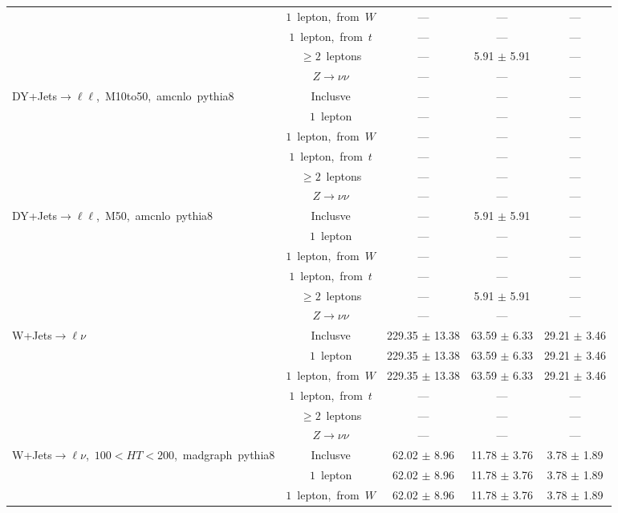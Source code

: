\documentclass{article}
\begin{document}
\begin{longtable}{|l|c|c|c|c|}
 & $1$~lepton,~from~$W$  & ---  & ---  & --- \\* 
 & $1$~lepton,~from~$t$  & ---  & ---  & --- \\* 
 & $\ge2$~leptons  & ---  & 5.91 $\pm$ 5.91  & --- \\* 
 & $Z\rightarrow\nu\nu$  & ---  & ---  & --- \\* 
\hline 
\multirow{6}{*}{DY+Jets$\rightarrow\ell\ell$,~M10to50,~amcnlo~pythia8} & Inclusve  & ---  & ---  & --- \\* 
 & $1$~lepton  & ---  & ---  & --- \\* 
 & $1$~lepton,~from~$W$  & ---  & ---  & --- \\* 
 & $1$~lepton,~from~$t$  & ---  & ---  & --- \\* 
 & $\ge2$~leptons  & ---  & ---  & --- \\* 
 & $Z\rightarrow\nu\nu$  & ---  & ---  & --- \\* 
\hline 
\multirow{6}{*}{DY+Jets$\rightarrow\ell\ell$,~M50,~amcnlo~pythia8} & Inclusve  & ---  & 5.91 $\pm$ 5.91  & --- \\* 
 & $1$~lepton  & ---  & ---  & --- \\* 
 & $1$~lepton,~from~$W$  & ---  & ---  & --- \\* 
 & $1$~lepton,~from~$t$  & ---  & ---  & --- \\* 
 & $\ge2$~leptons  & ---  & 5.91 $\pm$ 5.91  & --- \\* 
 & $Z\rightarrow\nu\nu$  & ---  & ---  & --- \\* 
\hline 
\multirow{6}{*}{W+Jets$\rightarrow\ell\nu$} & Inclusve  & 229.35 $\pm$ 13.38  & 63.59 $\pm$ 6.33  & 29.21 $\pm$ 3.46 \\* 
 & $1$~lepton  & 229.35 $\pm$ 13.38  & 63.59 $\pm$ 6.33  & 29.21 $\pm$ 3.46 \\* 
 & $1$~lepton,~from~$W$  & 229.35 $\pm$ 13.38  & 63.59 $\pm$ 6.33  & 29.21 $\pm$ 3.46 \\* 
 & $1$~lepton,~from~$t$  & ---  & ---  & --- \\* 
 & $\ge2$~leptons  & ---  & ---  & --- \\* 
 & $Z\rightarrow\nu\nu$  & ---  & ---  & --- \\* 
\hline 
\multirow{6}{*}{W+Jets$\rightarrow\ell\nu$,~$100<HT<200$,~madgraph~pythia8} & Inclusve  & 62.02 $\pm$ 8.96  & 11.78 $\pm$ 3.76  & 3.78 $\pm$ 1.89 \\* 
 & $1$~lepton  & 62.02 $\pm$ 8.96  & 11.78 $\pm$ 3.76  & 3.78 $\pm$ 1.89 \\* 
 & $1$~lepton,~from~$W$  & 62.02 $\pm$ 8.96  & 11.78 $\pm$ 3.76  & 3.78 $\pm$ 1.89 \\* 

\end{longtable}
\end{document}
